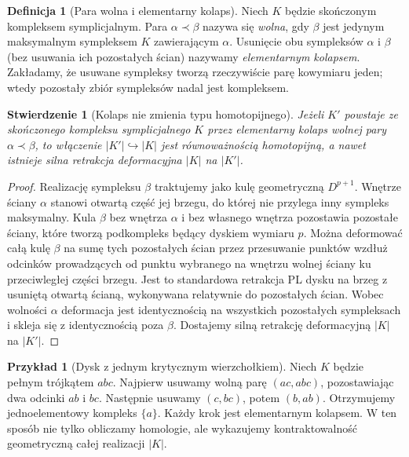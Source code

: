 \documentclass[11pt,a4paper]{report}
\numberwithin{equation}{section}
\theoremstyle{plain}
\newtheorem{stwierdzenie}[twierdzenie]{Stwierdzenie}
\theoremstyle{definition}
\newtheorem{definicja}[twierdzenie]{Definicja}
\newtheorem{przyklad}[twierdzenie]{Przykład}
\theoremstyle{remark}
\begin{document}
\begin{definicja}[Para wolna i elementarny kolaps]
Niech $K$ będzie skończonym kompleksem symplicjalnym.
Para $\alpha\prec\beta$ nazywa się \emph{wolna},
gdy $\beta$ jest jedynym maksymalnym sympleksem $K$
zawierającym $\alpha$. Usunięcie obu sympleksów
$\alpha$ i $\beta$ (bez usuwania ich pozostałych
ścian) nazywamy \emph{elementarnym kolapsem}.
Zakładamy, że usuwane sympleksy tworzą rzeczywiście
parę kowymiaru jeden; wtedy pozostały zbiór sympleksów
nadal jest kompleksem.
\end{definicja}

\begin{stwierdzenie}[Kolaps nie zmienia typu homotopijnego]
Jeżeli $K'$ powstaje ze skończonego kompleksu
symplicjalnego $K$ przez elementarny kolaps wolnej
pary $\alpha\prec\beta$, to włączenie
$|K'|\hookrightarrow|K|$ jest równoważnością homotopijną,
a nawet istnieje silna retrakcja deformacyjna
$|K|$ na $|K'|$.
\end{stwierdzenie}

\begin{proof}
Realizację sympleksu $\beta$ traktujemy jako kulę
geometryczną $D^{p+1}$. Wnętrze ściany $\alpha$
stanowi otwartą część jej brzegu, do której nie
przylega inny sympleks maksymalny. Kula $\beta$
bez wnętrza $\alpha$ i bez własnego wnętrza
pozostawia pozostałe ściany, które tworzą podkompleks
będący dyskiem wymiaru $p$. Można deformować całą
kulę $\beta$ na sumę tych pozostałych ścian przez
przesuwanie punktów wzdłuż odcinków prowadzących
od punktu wybranego na wnętrzu wolnej ściany ku
przeciwległej części brzegu. Jest to standardowa
retrakcja PL dysku na brzeg z usuniętą otwartą ścianą,
wykonywana relatywnie do pozostałych ścian.
Wobec wolności $\alpha$ deformacja jest identycznością
na wszystkich pozostałych sympleksach i skleja się
z identycznością poza $\beta$. Dostajemy silną
retrakcję deformacyjną $|K|$ na $|K'|$.
\end{proof}

\begin{przyklad}[Dysk z jednym krytycznym wierzchołkiem]
Niech $K$ będzie pełnym trójkątem $abc$. Najpierw
usuwamy wolną parę $(ac,abc)$, pozostawiając dwa
odcinki $ab$ i $bc$. Następnie usuwamy
$(c,bc)$, potem $(b,ab)$. Otrzymujemy jednoelementowy
kompleks $\{a\}$. Każdy krok jest elementarnym
kolapsem. W ten sposób nie tylko obliczamy homologie,
ale wykazujemy kontraktowalność geometryczną całej
realizacji $|K|$.
\end{przyklad}
\end{document}
